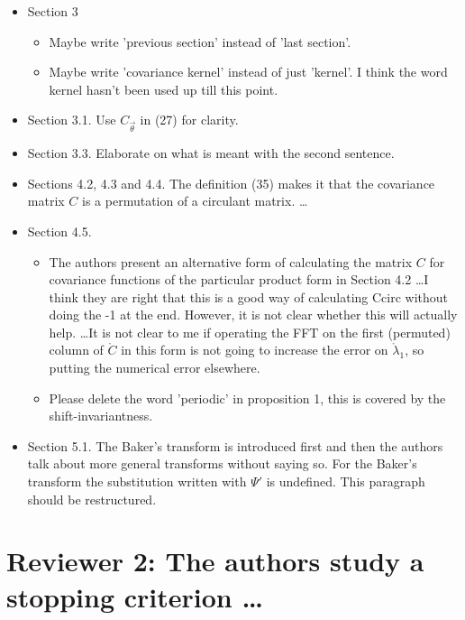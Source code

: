 \documentclass{amsart}
\begin{document}
\begin{itemize}
\item Section 3
\begin{itemize}
\item Maybe write 'previous section' instead of 'last section'.
\item Maybe write 'covariance kernel' instead of just 'kernel'. I think the word
kernel hasn't been used up till this point.
\end{itemize}

\item Section 3.1. Use $C_{\vec{\theta}}$ in (27) for clarity.

\item Section 3.3. Elaborate on what is meant with the second sentence.

\item Sections 4.2, 4.3 and 4.4. 
The definition (35) makes it that the covariance matrix $C$ is a permutation
of a circulant matrix. \ldots

\item  Section 4.5. 
\begin{itemize}
    \item The authors present an alternative form of calculating the matrix $C$ for
covariance functions of the particular product form in Section 4.2 \ldots I think they are right that this is a good
way of calculating Ccirc without doing the -1 at the end.
However, it is not clear whether this will actually help. \ldots It is not clear to me if operating
the FFT on the first (permuted) column of $\mathring{C}$ in this form is not going to
increase the error on $\mathring{\lambda}_1$, so putting the numerical error elsewhere.

\item Please delete the word 'periodic' in proposition 1, this is covered by the
shift-invariantness.
\end{itemize}

\item Section 5.1. The Baker's transform is introduced first and then the authors talk about
more general transforms without saying so. For the Baker's transform the
substitution written with $\Psi'$ is undefined. This paragraph should be
restructured.

\end{itemize}



\section*{Reviewer 2: The authors study a stopping criterion \ldots}
\end{document}
